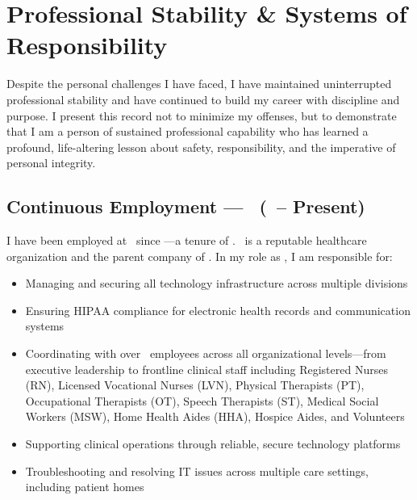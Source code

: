 
\section{Professional Stability \& Systems of Responsibility}

Despite the personal challenges I have faced, I have maintained uninterrupted professional stability and have continued to build my career with discipline and purpose. I present this record not to minimize my offenses, but to demonstrate that I am a person of sustained professional capability who has learned a profound, life-altering lesson about safety, responsibility, and the imperative of personal integrity.

\subsection{Continuous Employment --- \EmployerName\ (\EmployerSince\ -- Present)}

I have been employed at \EmployerName\ since \EmployerSince---a tenure of \EmployerTenure. \EmployerName\ is a reputable healthcare organization and the parent company of \EmployerDivisions. In my role as \EmployerRole, I am responsible for:

\begin{itemize}[leftmargin=2em, itemsep=0.2em]
  \item Managing and securing all technology infrastructure across multiple divisions
  \item Ensuring HIPAA compliance for electronic health records and communication systems
  \item Coordinating with over \TeamSize\ employees across all organizational levels---from executive leadership to frontline clinical staff including Registered Nurses (RN), Licensed Vocational Nurses (LVN), Physical Therapists (PT), Occupational Therapists (OT), Speech Therapists (ST), Medical Social Workers (MSW), Home Health Aides (HHA), Hospice Aides, and Volunteers
  \item Supporting clinical operations through reliable, secure technology platforms
  \item Troubleshooting and resolving IT issues across multiple care settings, including patient homes
\end{itemize}

